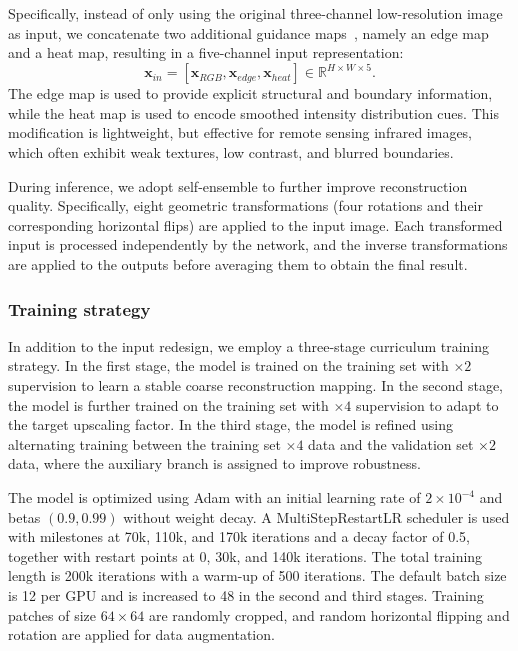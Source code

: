 \documentclass[10pt,twocolumn,letterpaper]{article}
\begin{document}
Specifically, instead of only using the original three-channel low-resolution image as input, we concatenate two additional guidance maps~\cite{zou2026toward}, namely an edge map and a heat map, resulting in a five-channel input representation:
\[
\mathbf{x}_{in} = [\mathbf{x}_{RGB}, \mathbf{x}_{edge}, \mathbf{x}_{heat}] \in \mathbb{R}^{H \times W \times 5}.
\]
The edge map is used to provide explicit structural and boundary information, while the heat map is used to encode smoothed intensity distribution cues. This modification is lightweight, but effective for remote sensing infrared images, which often exhibit weak textures, low contrast, and blurred boundaries.

During inference, we adopt self-ensemble to further improve reconstruction quality. 
Specifically, eight geometric transformations (four rotations and their corresponding horizontal flips) are applied to the input image. 
Each transformed input is processed independently by the network, and the inverse transformations are applied to the outputs before averaging them to obtain the final result.

\subsubsection{Training strategy}

In addition to the input redesign, we employ a three-stage curriculum training strategy. 
In the first stage, the model is trained on the training set with $\times2$ supervision to learn a stable coarse reconstruction mapping. 
In the second stage, the model is further trained on the training set with $\times4$ supervision to adapt to the target upscaling factor. 
In the third stage, the model is refined using alternating training between the training set $\times4$ data and the validation set $\times2$ data, where the auxiliary branch is assigned to improve robustness.

The model is optimized using Adam with an initial learning rate of $2\times10^{-4}$ and betas $(0.9, 0.99)$ without weight decay. 
A MultiStepRestartLR scheduler is used with milestones at 70k, 110k, and 170k iterations and a decay factor of 0.5, together with restart points at 0, 30k, and 140k iterations. 
The total training length is 200k iterations with a warm-up of 500 iterations. 
The default batch size is 12 per GPU and is increased to 48 in the second and third stages. 
Training patches of size $64\times64$ are randomly cropped, and random horizontal flipping and rotation are applied for data augmentation.
\end{document}
